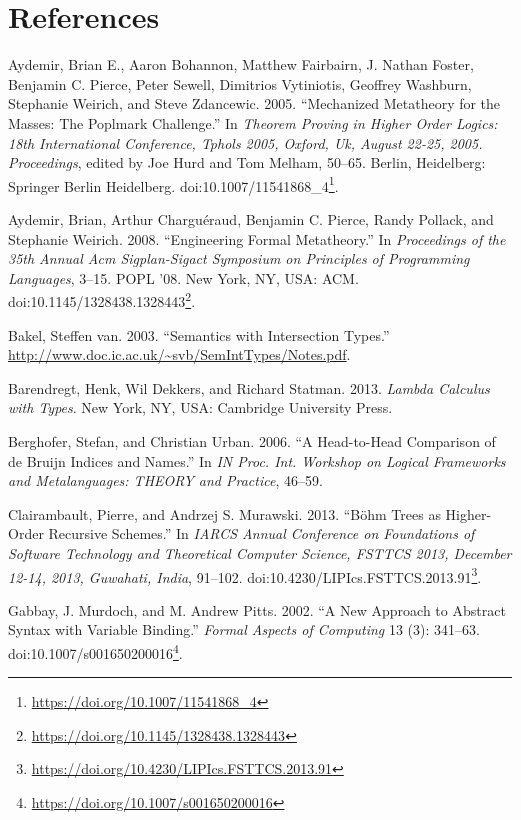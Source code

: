 \documentclass[a4paper, 12pt, twoside]{style/ociamthesis}
\theoremstyle{plain}
\theoremstyle{definition}
\theoremstyle{remark}
\renewcommand{\href}[2]{#2\footnote{\url{#1}}}
\begin{document}
\footnotesize

\chapter*{References}\label{references}

\hypertarget{refs}{}
\hypertarget{ref-aydemir05}{}
Aydemir, Brian E., Aaron Bohannon, Matthew Fairbairn, J. Nathan Foster,
Benjamin C. Pierce, Peter Sewell, Dimitrios Vytiniotis, Geoffrey
Washburn, Stephanie Weirich, and Steve Zdancewic. 2005. ``Mechanized
Metatheory for the Masses: The Poplmark Challenge.'' In \emph{Theorem
Proving in Higher Order Logics: 18th International Conference, Tphols
2005, Oxford, Uk, August 22-25, 2005. Proceedings}, edited by Joe Hurd
and Tom Melham, 50--65. Berlin, Heidelberg: Springer Berlin Heidelberg.
doi:\href{https://doi.org/10.1007/11541868_4}{10.1007/11541868\_4}.

\hypertarget{ref-aydemir08}{}
Aydemir, Brian, Arthur Charguéraud, Benjamin C. Pierce, Randy Pollack,
and Stephanie Weirich. 2008. ``Engineering Formal Metatheory.'' In
\emph{Proceedings of the 35th Annual Acm Sigplan-Sigact Symposium on
Principles of Programming Languages}, 3--15. POPL '08. New York, NY,
USA: ACM.
doi:\href{https://doi.org/10.1145/1328438.1328443}{10.1145/1328438.1328443}.

\hypertarget{ref-bakel}{}
Bakel, Steffen van. 2003. ``Semantics with Intersection Types.''
\url{http://www.doc.ic.ac.uk/~svb/SemIntTypes/Notes.pdf}.

\hypertarget{ref-barendregt13}{}
Barendregt, Henk, Wil Dekkers, and Richard Statman. 2013. \emph{Lambda
Calculus with Types}. New York, NY, USA: Cambridge University Press.

\hypertarget{ref-berghofer06}{}
Berghofer, Stefan, and Christian Urban. 2006. ``A Head-to-Head
Comparison of de Bruijn Indices and Names.'' In \emph{IN Proc. Int.
Workshop on Logical Frameworks and Metalanguages: THEORY and Practice},
46--59.

\hypertarget{ref-clairambault13}{}
Clairambault, Pierre, and Andrzej S. Murawski. 2013. ``Böhm Trees as
Higher-Order Recursive Schemes.'' In \emph{IARCS Annual Conference on
Foundations of Software Technology and Theoretical Computer Science,
FSTTCS 2013, December 12-14, 2013, Guwahati, India}, 91--102.
doi:\href{https://doi.org/10.4230/LIPIcs.FSTTCS.2013.91}{10.4230/LIPIcs.FSTTCS.2013.91}.

\hypertarget{ref-gabbay02}{}
Gabbay, J. Murdoch, and M. Andrew Pitts. 2002. ``A New Approach to
Abstract Syntax with Variable Binding.'' \emph{Formal Aspects of
Computing} 13 (3): 341--63.
doi:\href{https://doi.org/10.1007/s001650200016}{10.1007/s001650200016}.
\end{document}
